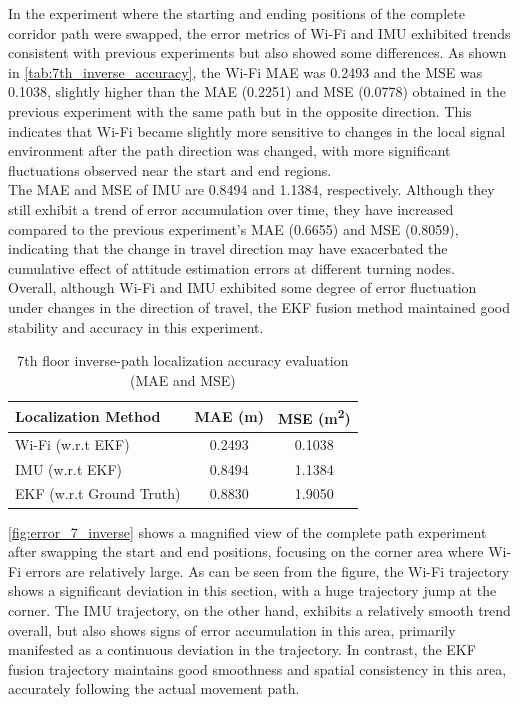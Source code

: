 \documentclass[12pt,a4paper]{article}
\numberwithin{equation}{section}
\begin{document}
\noindent In the experiment where the starting and ending positions of the complete corridor path were swapped, the error metrics of Wi-Fi and IMU exhibited trends consistent with previous experiments but also showed some differences. As shown in \autoref{tab:7th_inverse_accuracy}, the Wi-Fi MAE was 0.2493 and the MSE was 0.1038, slightly higher than the MAE (0.2251) and MSE (0.0778) obtained in the previous experiment with the same path but in the opposite direction. This indicates that Wi-Fi became slightly more sensitive to changes in the local signal environment after the path direction was changed, with more significant fluctuations observed near the start and end regions.\\
The MAE and MSE of IMU are 0.8494 and 1.1384, respectively. Although they still exhibit a trend of error accumulation over time, they have increased compared to the previous experiment's MAE (0.6655) and MSE (0.8059), indicating that the change in travel direction may have exacerbated the cumulative effect of attitude estimation errors at different turning nodes.\\
Overall, although Wi-Fi and IMU exhibited some degree of error fluctuation under changes in the direction of travel, the EKF fusion method maintained good stability and accuracy in this experiment.
\begin{table}[H]
\centering
\caption{7th floor inverse-path localization accuracy evaluation (MAE and MSE)}
\label{tab:7th_inverse_accuracy}
\begin{tabular}{lcc}
\toprule
\textbf{Localization Method} & \textbf{MAE (m)} & \textbf{MSE (m\textsuperscript{2})} \\
\midrule
Wi-Fi (w.r.t EKF) & 0.2493 & 0.1038 \\
IMU (w.r.t EKF) & 0.8494 & 1.1384 \\
EKF (w.r.t Ground Truth) & 0.8830 & 1.9050 \\
\bottomrule
\end{tabular}
\end{table}
\noindent \autoref{fig:error_7_inverse} shows a magnified view of the complete path experiment after swapping the start and end positions, focusing on the corner area where Wi-Fi errors are relatively large. As can be seen from the figure, the Wi-Fi trajectory shows a significant deviation in this section, with a huge trajectory jump at the corner. The IMU trajectory, on the other hand, exhibits a relatively smooth trend overall, but also shows signs of error accumulation in this area, primarily manifested as a continuous deviation in the trajectory. In contrast, the EKF fusion trajectory maintains good smoothness and spatial consistency in this area, accurately following the actual movement path.
\end{document}
